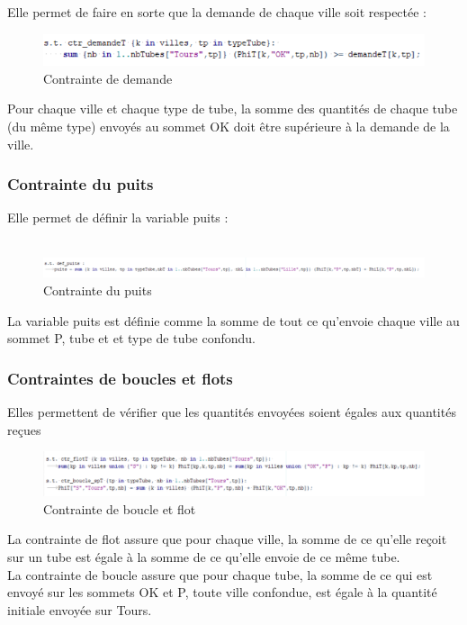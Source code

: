 \documentclass{polytech/polytech}
\numberwithin{figure}{chapter}
\begin{document}
Elle permet de faire en sorte que la demande de chaque ville soit respectée :

\begin{figure}[ht]
    \centering
    \includegraphics[width=\textwidth]{pic/demande.png}
    \caption{Contrainte de demande}
\end{figure}

Pour chaque ville et chaque type de tube, la somme des quantités de chaque tube (du même type) envoyés au sommet OK doit être supérieure à la demande de la ville.

\subsubsection{Contrainte du puits}

Elle permet de définir la variable puits :\\ \\

\begin{figure}[h]
    \centering
    \includegraphics[width=\textwidth]{pic/puits.png}
    \caption{Contrainte du puits}
\end{figure}

La variable puits est définie comme la somme de tout ce qu'envoie chaque ville au sommet P, tube et et type de tube confondu.

\subsubsection{Contraintes de boucles et flots}

Elles permettent de vérifier que les quantités envoyées soient égales aux quantités reçues

\begin{figure}[ht]
    \centering
    \includegraphics[width=\textwidth]{pic/flot.png}
    \caption{Contrainte de boucle et flot}
\end{figure}

La contrainte de flot assure que pour chaque ville, la somme de ce qu'elle reçoit sur un tube est égale à la somme de ce qu'elle envoie de ce même tube.\\
La contrainte de boucle assure que pour chaque tube, la somme de ce qui est envoyé sur les sommets OK et P, toute ville confondue, est égale à la quantité initiale envoyée sur Tours. 
\end{document}
